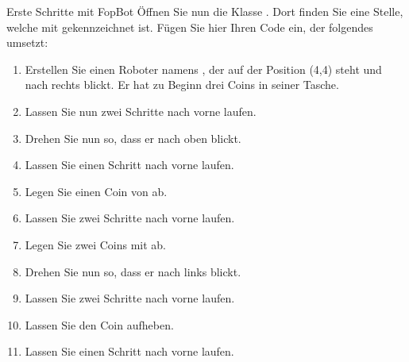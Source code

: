 \documentclass{../preamble}
\date{09.11.2020 - 13.11.2020}
\begin{document}
\maketitle

\makedisclaimer

\clearpage

\setcounter{task}{1}

\begin{task}[credit = \stars{1}{3}]{Erste Schritte mit FopBot}
    Öffnen Sie nun die Klasse . Dort finden Sie eine Stelle, welche mit  gekennzeichnet ist. Fügen Sie hier Ihren Code ein, der folgendes umsetzt:
    \begin{enumerate}
        \item Erstellen  Sie  einen  Roboter  namens ,  der  auf  der  Position (4,4) steht  und nach rechts blickt. Er hat zu Beginn drei Coins in seiner Tasche.
        \item Lassen Sie  nun zwei Schritte nach vorne laufen.
        \item Drehen Sie  nun so, dass er nach oben blickt.
        \item Lassen Sie  einen Schritt nach vorne laufen.
        \item Legen Sie einen Coin von  ab.
        \item Lassen Sie  zwei Schritte nach vorne laufen.
        \item Legen Sie zwei Coins mit  ab.
        \item Drehen Sie  nun so, dass er nach links blickt.
        \item Lassen Sie  zwei Schritte nach vorne laufen.
        \item Lassen Sie  den Coin aufheben.
        \item Lassen Sie  einen Schritt nach vorne laufen.
    \end{enumerate}

    \clearpage

    \begin{solution}
        
    \end{solution}
\end{task}

\clearpage
\end{document}
